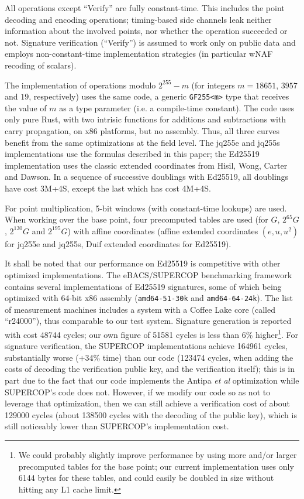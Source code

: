\documentclass{llncs}
\begin{document}
All operations except ``Verify'' are fully constant-time. This includes
the point decoding and encoding operations; timing-based side channels
leak neither information about the involved points, nor whether the
operation succeeded or not. Signature verification (``Verify'') is
assumed to work only on public data and employs non-constant-time
implementation strategies (in particular wNAF recoding of scalars).

The implementation of operations modulo $2^{255}-m$ (for integers $m =
18651$, $3957$ and $19$, respectively) uses the same code, a generic
\verb+GF255<m>+ type that receives the value of $m$ as a type parameter
(i.e. a compile-time constant). The code uses only pure Rust, with two
intrisic functions for additions and subtractions with carry
propagation, on x86 platforms, but no assembly. Thus, all three curves
benefit from the same optimizations at the field level. The jq255e and
jq255s implementations use the formulas described in this paper; the
Ed25519 implementation uses the classic extended coordinates from Hisil,
Wong, Carter and Dawson\cite{HisWonCarDaw2008}. In a sequence of
successive doublings with Ed25519, all doublings have cost 3M+4S, except
the last which has cost 4M+4S.

For point multiplication, 5-bit windows (with constant-time lookups) are
used. When working over the base point, four precomputed tables are used
(for $G$, $2^{65}G$, $2^{130}G$ and $2^{195}G$) with affine coordinates
(affine extended coordinates $(e,u,u^2)$ for jq255e and jq255s, Duif
extended coordinates for Ed25519).

It shall be noted that our performance on Ed25519 is competitive with
other optimized implementations. The eBACS/SUPERCOP benchmarking
framework\cite{eBACS} contains several implementations of Ed25519
signatures, some of which being optimized with 64-bit x86 assembly
(\verb+amd64-51-30k+ and \verb+amd64-64-24k+). The list of measurement
machines includes a system with a Coffee Lake core (called ``r24000''),
thus comparable to our test system. Signature generation is reported
with cost 48744 cycles; our own figure of 51581 cycles is less than 6\%
higher\footnote{We could probably slightly improve performance by using
more and/or larger precomputed tables for the base point; our current
implementation uses only 6144 bytes for these tables, and could easily
be doubled in size without hitting any L1 cache limit.}. For signature
verification, the SUPERCOP implementations achieve 164961 cycles,
substantially worse (+34\% time) than our code (123474 cycles, when
adding the costs of decoding the verification public key, and the
verification itself); this is in part due to the fact that our code
implements the Antipa \emph{et al}
optimization\cite{AntBroGalLamStrVan2005,Por2020-2} while SUPERCOP's
code does not. However, if we modify our code so as not to leverage that
optimization, then we can still achieve a verification cost of about
129000 cycles (about 138500 cycles with the decoding of the public key),
which is still noticeably lower than SUPERCOP's implementation cost.
\end{document}
